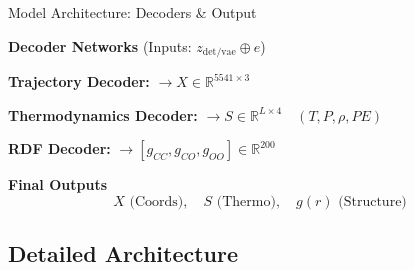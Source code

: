 \documentclass[aspectratio=169, 10pt]{beamer}
\begin{document}
\begin{frame}[fragile]{Model Architecture: Decoders \& Output}
    \centering
    \begin{algorithm}[H]
        \caption*{End-to-End Pipeline Overview (Part 3)}
        \begin{algorithmic}[1]
            
            \State \textbf{Decoder Networks} (Inputs: $z_{\mathrm{det/vae}} \oplus e$)
            
            \vspace{0.3em}
            \State \hspace{1em} \textbf{Trajectory Decoder:}
            \State \hspace{2em} $\rightarrow X \in \mathbb{R}^{5541 \times 3}$
            
            \vspace{0.3em}
            \State \hspace{1em} \textbf{Thermodynamics Decoder:}
            \State \hspace{2em} $\rightarrow S \in \mathbb{R}^{L \times 4} \quad (T, P, \rho, PE)$
            
            \vspace{0.3em}
            \State \hspace{1em} \textbf{RDF Decoder:}
            \State \hspace{2em} $\rightarrow [g_{CC}, g_{CO}, g_{OO}] \in \mathbb{R}^{200}$
            
            \Statex \hrulefill
            
            \State \textbf{Final Outputs}
            \[
                X \text{ (Coords)}, \quad S \text{ (Thermo)}, \quad g(r) \text{ (Structure)}
            \]
        \end{algorithmic}
    \end{algorithm}
\end{frame}
    

\subsection{Detailed Architecture}
\end{document}
